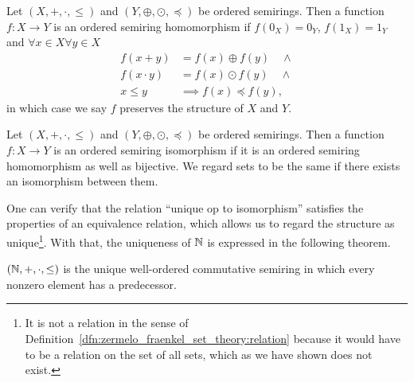 \documentclass[../main.tex]{subfiles}
\begin{document}
\begin{definition}\label{dfn:the_natural_numbers_integers_and_rational_numbers:ordered_semiring_homomorphism}
        Let $(X,+,\cdot,\leq)$ and \linebreak$(Y,\oplus,\odot,\preceq)$ be ordered semirings. Then a function $f:X\to Y$ is an ordered semiring homomorphism if $f(0_X)=0_Y$, $f(1_X)=1_Y$ and $\forall x\in X\forall y\in X$
    \begin{align*}
        f(x+y) & =f(x)\oplus f(y)\quad\land \\
        f(x\cdot y) & =f(x)\odot f(y)\quad\land \\
        x\leq y & \implies f(x)\preceq f(y),
    \end{align*}
    in which case we say $f$ preserves the structure of $X$ and $Y$.
\end{definition}
\begin{definition}
    Let $(X,+,\cdot,\leq)$ and \linebreak$(Y,\oplus,\odot,\preceq)$ be ordered semirings. Then a function $f:X\to Y$ is an ordered semiring isomorphism if it is an ordered semiring homomorphism as well as bijective. We regard sets to be the same if there exists an isomorphism between them.
\end{definition}
One can verify that the relation ``unique op to isomorphism'' satisfies the properties of an equivalence relation, which allows us to regard the structure as unique\footnote{It is not a relation in the sense of Definition~\ref{dfn:zermelo_fraenkel_set_theory:relation} because it would have to be a relation on the set of all sets, which as we have shown does not exist.}. With that, the uniqueness of $\mathbb{N}$ is expressed in the following theorem.
\begin{theorem}\label{thm:the_natural_numbers_integers_and_rational_numbers:uniqueness_N}
    $(\mathbb{N},+,\cdot,\leq)$ is the unique well-ordered commutative semiring in which every nonzero element has a predecessor.
\end{theorem}
\end{document}
